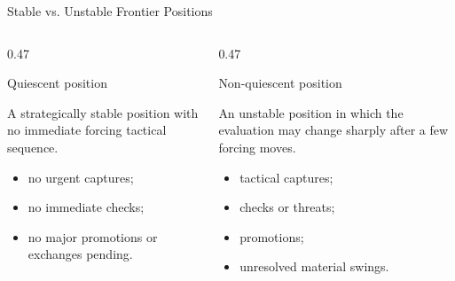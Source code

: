\documentclass[aspectratio=169,10pt]{beamer}
\begin{document}



\begin{frame}[shrink=18]{Stable vs. Unstable Frontier Positions}

  \begin{columns}[T,onlytextwidth]

    \begin{column}{0.47\textwidth}

      \begin{block}{Quiescent position}

        A strategically stable position with no immediate forcing tactical sequence.

        \begin{itemize}

          \item no urgent captures;

          \item no immediate checks;

          \item no major promotions or exchanges pending.

        \end{itemize}

      \end{block}

    \end{column}

    \begin{column}{0.47\textwidth}

      \begin{block}{Non-quiescent position}

        An unstable position in which the evaluation may change sharply after a few forcing moves.

        \begin{itemize}

          \item tactical captures;

          \item checks or threats;

          \item promotions;

          \item unresolved material swings.


\end{itemize}
\end{block}
\end{column}
\end{columns}
\end{frame}
\end{document}
